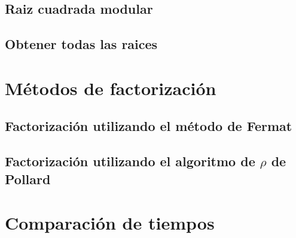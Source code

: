 \documentclass[12pt, spanish]{article}
\begin{document}
\subsection{Raiz cuadrada modular}

\subsection{Obtener todas las raices}


\section{Métodos de factorización}

\subsection{Factorización utilizando el método de Fermat}

\subsection{Factorización utilizando el algoritmo de $\rho$ de Pollard}



\section{Comparación de tiempos}


%
%
\end{document}
